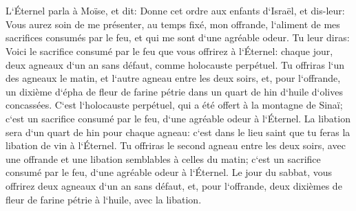 \chapter{}

\verse L`Éternel parla à Moïse, et dit: Donne cet ordre aux enfants d`Israël, et dis-leur: 
\verse Vous aurez soin de me présenter, au temps fixé, mon offrande, l`aliment de mes sacrifices consumés par le feu, et qui me sont d`une agréable odeur. 
\verse Tu leur diras: Voici le sacrifice consumé par le feu que vous offrirez à l`Éternel: chaque jour, deux agneaux d`un an sans défaut, comme holocauste perpétuel. 
\verse Tu offriras l`un des agneaux le matin, et l`autre agneau entre les deux soirs, 
\verse et, pour l`offrande, un dixième d`épha de fleur de farine pétrie dans un quart de hin d`huile d`olives concassées. 
\verse C`est l`holocauste perpétuel, qui a été offert à la montagne de Sinaï; c`est un sacrifice consumé par le feu, d`une agréable odeur à l`Éternel. 
\verse La libation sera d`un quart de hin pour chaque agneau: c`est dans le lieu saint que tu feras la libation de vin à l`Éternel. 
\verse Tu offriras le second agneau entre les deux soirs, avec une offrande et une libation semblables à celles du matin; c`est un sacrifice consumé par le feu, d`une agréable odeur à l`Éternel. 
\verse Le jour du sabbat, vous offrirez deux agneaux d`un an sans défaut, et, pour l`offrande, deux dixièmes de fleur de farine pétrie à l`huile, avec la libation. 
